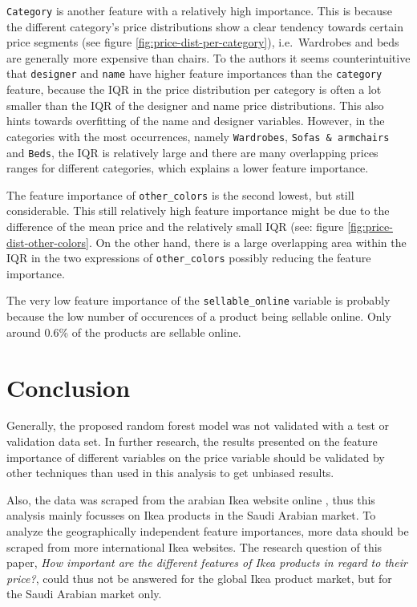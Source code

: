 \documentclass[a4paper, nobind]{templates/ociamthesis}
\begin{document}
\texttt{Category} is another feature with a relatively high importance. This is because the different category's price distributions show a clear tendency towards certain price segments (see figure \ref{fig:price-dist-per-category}), i.e.~Wardrobes and beds are generally more expensive than chairs.
To the authors it seems counterintuitive that \texttt{designer} and \texttt{name} have higher feature importances than the \texttt{category} feature, because the IQR in the price distribution per category is often a lot smaller than the IQR of the designer and name price distributions. This also hints towards overfitting of the name and designer variables. However, in the categories with the most occurrences, namely \texttt{Wardrobes}, \texttt{Sofas\ \&\ armchairs} and \texttt{Beds}, the IQR is relatively large and there are many overlapping prices ranges for different categories, which explains a lower feature importance.

The feature importance of \texttt{other\_colors} is the second lowest, but still considerable. This still relatively high feature importance might be due to the difference of the mean price and the relatively small IQR (see: figure \ref{fig:price-dist-other-colors}. On the other hand, there is a large overlapping area within the IQR in the two expressions of \texttt{other\_colors} possibly reducing the feature importance.

The very low feature importance of the \texttt{sellable\_online} variable is probably because the low number of occurences of a product being sellable online. Only around 0.6\% of the products are sellable online.

\hypertarget{conclusion}{%
\section{Conclusion}\label{conclusion}}

Generally, the proposed random forest model was not validated with a test or validation data set. In further research, the results presented on the feature importance of different variables on the price variable should be validated by other techniques than used in this analysis to get unbiased results.

Also, the data was scraped from the arabian Ikea website online , thus this analysis mainly focusses on Ikea products in the Saudi Arabian market. To analyze the geographically independent feature importances, more data should be scraped from more international Ikea websites. The research question of this paper, \emph{How important are the different features of Ikea products in regard to their price?}, could thus not be answered for the global Ikea product market, but for the Saudi Arabian market only.
\end{document}
